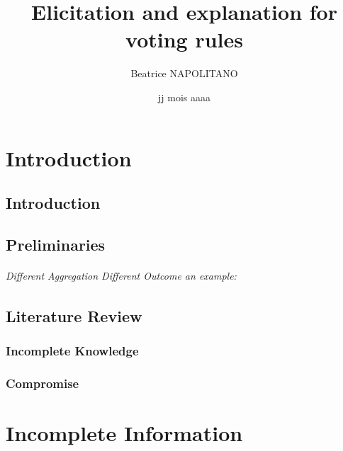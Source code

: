 \documentclass[a4paper, 11pt]{book}
\title{Elicitation and explanation for voting rules}
\author{Beatrice NAPOLITANO}
\institute{l'Université Paris-Dauphine}
\date{jj mois aaaa}
\begin{document}
\maketitle{}

\frontmatter

\begingroup
\hypersetup{hidelinks}

\tableofcontents

\listoffigures
{}

\listoftables
{}

\endgroup

\printglossary[toctitle=List of Abbreviations,title=List of Abbreviations,type=\acronymtype]

\mainmatter

\part{Introduction} 

	\chapter{Introduction}
		\label{ch:intro}
		
			
	\chapter{Preliminaries}
		\label{ch:preliminaries}
		
		\paragraph{Different Aggregation Different Outcome an example:}
		
	
	\chapter{Literature Review}
		\section{Incomplete Knowledge}
		\section{Compromise}
	
	
\part{Incomplete Information}
	\label{part:info}
\end{document}
